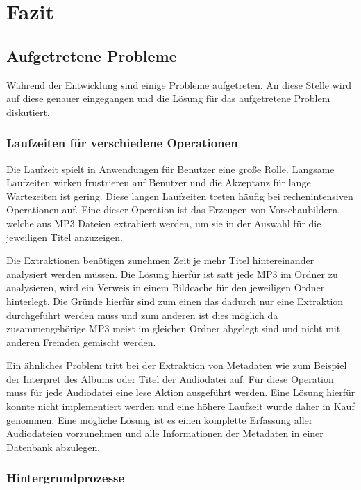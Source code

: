 \section{Fazit}

\subsection{Aufgetretene Probleme}

Während der Entwicklung sind einige Probleme aufgetreten. An diese Stelle wird auf diese genauer eingegangen und die Lösung für das aufgetretene Problem diskutiert.

\subsubsection{Laufzeiten für verschiedene Operationen}

Die Laufzeit spielt in Anwendungen für Benutzer eine große Rolle. Langsame Laufzeiten wirken frustrieren auf Benutzer und die Akzeptanz für lange Wartezeiten ist gering. Diese langen Laufzeiten treten häufig bei rechenintensiven Operationen auf. Eine dieser Operation ist das Erzeugen von Vorschaubildern, welche aus MP3 Dateien extrahiert werden, um sie in der Auswahl für die jeweiligen Titel anzuzeigen.

Die Extraktionen benötigen zunehmen Zeit je mehr Titel hintereinander analysiert werden müssen. Die Lösung hierfür ist satt jede MP3 im Ordner zu analysieren, wird ein Verweis in einem Bildcache für den jeweiligen Ordner hinterlegt. Die Gründe hierfür sind zum einen das dadurch nur eine Extraktion durchgeführt werden muss und zum anderen ist dies möglich da zusammengehörige MP3 meist im gleichen Ordner abgelegt sind und nicht mit anderen Fremden gemischt werden.

Ein ähnliches Problem tritt bei der Extraktion von Metadaten wie zum Beispiel der Interpret des Albums oder Titel der Audiodatei auf. Für diese Operation muss für jede Audiodatei eine lese Aktion ausgeführt werden. Eine Lösung hierfür konnte nicht implementiert werden und eine höhere Laufzeit wurde daher in Kauf genommen. Eine mögliche Lösung ist es einen komplette Erfassung aller Audiodateien vorzunehmen und alle Informationen der Metadaten in einer Datenbank abzulegen.

\subsubsection{Hintergrundprozesse}

